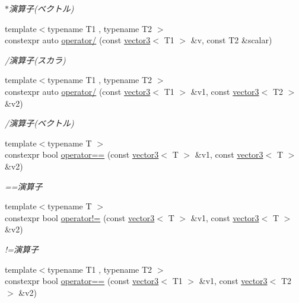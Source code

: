 \begin{DoxyCompactItemize}
\begin{DoxyCompactList}\small\item\em $\ast$演算子(ベクトル) \end{DoxyCompactList}\item 
{\footnotesize template$<$typename T1 , typename T2 $>$ }\\constexpr auto \mbox{\hyperlink{namespacesaki_a15270d7bd5638726debe317a16a6b26b}{operator/}} (const \mbox{\hyperlink{classsaki_1_1vector3}{vector3}}$<$ T1 $>$ \&v, const T2 \&scalar)
\begin{DoxyCompactList}\small\item\em /演算子(スカラ) \end{DoxyCompactList}\item 
{\footnotesize template$<$typename T1 , typename T2 $>$ }\\constexpr auto \mbox{\hyperlink{namespacesaki_aee335c88f00f71e52e37fd4bfb77b181}{operator/}} (const \mbox{\hyperlink{classsaki_1_1vector3}{vector3}}$<$ T1 $>$ \&v1, const \mbox{\hyperlink{classsaki_1_1vector3}{vector3}}$<$ T2 $>$ \&v2)
\begin{DoxyCompactList}\small\item\em /演算子(ベクトル) \end{DoxyCompactList}\item 
{\footnotesize template$<$typename T $>$ }\\constexpr bool \mbox{\hyperlink{namespacesaki_a3ce1faca02399d52a09851a1b6e8afe3}{operator==}} (const \mbox{\hyperlink{classsaki_1_1vector3}{vector3}}$<$ T $>$ \&v1, const \mbox{\hyperlink{classsaki_1_1vector3}{vector3}}$<$ T $>$ \&v2)
\begin{DoxyCompactList}\small\item\em ==演算子 \end{DoxyCompactList}\item 
{\footnotesize template$<$typename T $>$ }\\constexpr bool \mbox{\hyperlink{namespacesaki_aa8b0dcab7f268e88f01c92c95cd12135}{operator!=}} (const \mbox{\hyperlink{classsaki_1_1vector3}{vector3}}$<$ T $>$ \&v1, const \mbox{\hyperlink{classsaki_1_1vector3}{vector3}}$<$ T $>$ \&v2)
\begin{DoxyCompactList}\small\item\em !=演算子 \end{DoxyCompactList}\item 
{\footnotesize template$<$typename T1 , typename T2 $>$ }\\constexpr bool \mbox{\hyperlink{namespacesaki_a5f3eb3ebd6a3ee43771849069101153f}{operator==}} (const \mbox{\hyperlink{classsaki_1_1vector3}{vector3}}$<$ T1 $>$ \&v1, const \mbox{\hyperlink{classsaki_1_1vector3}{vector3}}$<$ T2 $>$ \&v2)

\end{DoxyCompactItemize}
